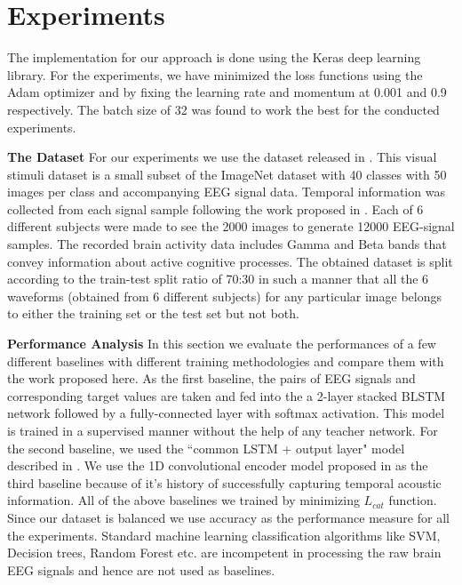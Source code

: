 \documentclass{article}
\begin{document}
\section{Experiments}
\label{sec:exp}

The implementation for our approach is done using the Keras deep learning library. For the experiments, we have minimized the loss functions using the Adam optimizer and by fixing the learning rate and momentum at 0.001 and 0.9 respectively. The batch size of 32 was found to work the best for the conducted experiments.

\textbf{The Dataset}
For our experiments we use the dataset released in \cite{spampinato2017deep}. This visual stimuli dataset is a small subset of the ImageNet dataset with 40 classes with 50 images per class and accompanying EEG signal data. Temporal information was collected from each signal sample following the work proposed in \cite{spampinato2017deep}. Each of 6 different subjects were made to see the 2000 images to generate 12000 EEG-signal samples. The recorded brain activity data includes Gamma and Beta bands \cite{spampinato2017deep} that convey information about active cognitive processes. The obtained dataset is split according to the train-test split ratio of 70:30 in such a manner that all the 6 waveforms (obtained from 6 different subjects) for any particular image belongs to either the training set or the test set but not both.


\textbf{Performance Analysis}
In this section we evaluate the performances of a few different baselines with different training methodologies and compare them with the work proposed here. As the first baseline, the pairs of EEG signals and corresponding target values are taken and fed into the a 2-layer stacked BLSTM network followed by a fully-connected layer with softmax activation. This model is trained in a supervised manner without the help of any teacher network. For the second baseline, we used the ``common LSTM + output layer" model described in \cite{spampinato2017deep}.
We use the 1D convolutional encoder model proposed in \cite{aytar2016soundnet} as the third baseline because of it's history of successfully capturing temporal acoustic information. All of the above baselines we trained by minimizing $L_{cat}$ function. Since our dataset is balanced we use accuracy as the performance measure for all the experiments. Standard machine learning classification algorithms like SVM, Decision trees, Random Forest etc. are incompetent in processing the raw brain EEG signals and hence are not used as baselines. 
\end{document}
